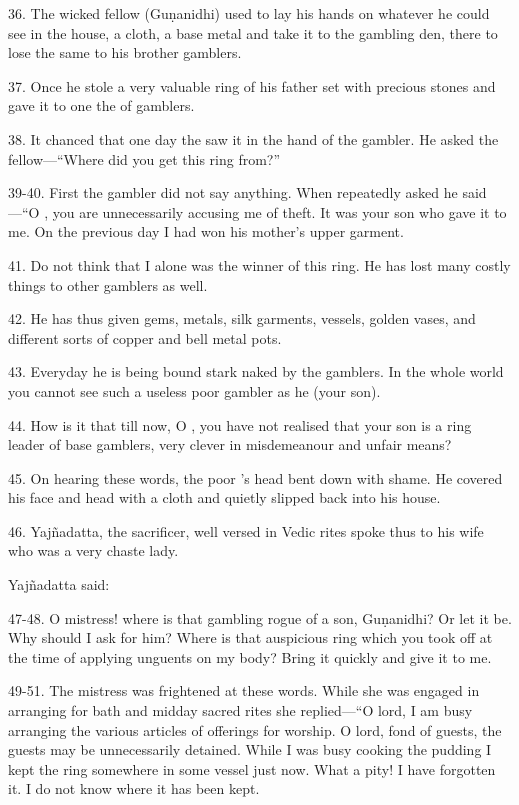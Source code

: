 36. The wicked fellow (Guṇanidhi) used to lay his hands on whatever he could see
in the house, a cloth, a base metal \etc and take it to the gambling den, there
to lose the same to his brother gamblers.

37. Once he stole a very valuable ring of his father set with precious stones
and gave it to one the of gamblers.

38. It chanced that one day the  saw it in the hand of the gambler.
He asked the fellow—“Where did you get this ring from?”

39-40. First the gambler did not say anything. When repeatedly asked he said—“O
, you are unnecessarily accusing me of theft. It was your son who
gave it to me. On the previous day I had won his mother’s upper garment.

41. Do not think that I alone was the winner of this ring. He has lost many
costly things to other gamblers as well.

42. He has thus given gems, metals, silk garments, vessels, golden vases, and
different sorts of copper and bell metal pots.

43. Everyday he is being bound stark naked by the gamblers. In the whole world
you cannot see such a useless poor gambler as he (your son).

44. How is it that till now, O , you have not realised that your
son is a ring leader of base gamblers, very clever in misdemeanour and unfair
means?

45. On hearing these words, the poor ’s head bent down with shame.
He covered his face and head with a cloth and quietly slipped back into his
house.

46. Yajñadatta, the sacrificer, well versed in Vedic rites spoke thus to his
wife who was a very chaste lady.

Yajñadatta said:

47-48. O mistress! where is that gambling rogue of a son, Guṇanidhi? Or let it
be. Why should I ask for him? Where is that auspicious ring which you took off
at the time of applying unguents on my body? Bring it quickly and give it to me.

49-51. The mistress was frightened at these words. While she was engaged in
arranging for bath and midday sacred rites she replied—“O lord, I am busy
arranging the various articles of offerings for worship. O lord, fond of guests,
the guests may be unnecessarily detained. While I was busy cooking the pudding
I kept the ring somewhere in some vessel just now. What a pity! I have forgotten
it. I do not know where it has been kept.

